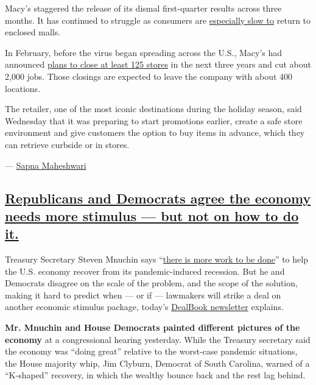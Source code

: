 Macy's staggered the release of its dismal first-quarter results across
three months. It has continued to struggle as consumers are
\href{https://www.nytimes3xbfgragh.onion/interactive/2020/08/18/business/economy/coronavirus-economic-recovery-states.html}{especially
slow to} return to enclosed malls.

In February, before the virus began spreading across the U.S., Macy's
had announced
\href{https://www.nytimes3xbfgragh.onion/2020/02/04/business/macys-store-closings.html}{plans
to close at least 125 stores} in the next three years and cut about
2,000 jobs. Those closings are expected to leave the company with about
400 locations.

The retailer, one of the most iconic destinations during the holiday
season, said Wednesday that it was preparing to start promotions
earlier, create a safe store environment and give customers the option
to buy items in advance, which they can retrieve curbside or in stores.

--- \href{https://www.nytimes3xbfgragh.onion/by/sapna-maheshwari}{Sapna
Maheshwari}

\hypertarget{republicans-and-democrats-agree-the-economy-needs-more-stimulus--but-not-on-how-to-do-it}{%
\subsection{\texorpdfstring{\protect\hyperlink{mnuchin}{Republicans and
Democrats agree the economy needs more stimulus --- but not on how to do
it.}}{Republicans and Democrats agree the economy needs more stimulus --- but not on how to do it.}}\label{republicans-and-democrats-agree-the-economy-needs-more-stimulus--but-not-on-how-to-do-it}}

Treasury Secretary Steven Mnuchin says
``\href{https://www.nytimes3xbfgragh.onion/2020/09/01/business/economy/mnuchin-coronavirus.html}{there
is more work to be done}'' to help the U.S. economy recover from its
pandemic-induced recession. But he and Democrats disagree on the scale
of the problem, and the scope of the solution, making it hard to predict
when --- or if --- lawmakers will strike a deal on another economic
stimulus package, today's
\href{https://www.nytimes3xbfgragh.onion/2020/09/02/business/dealbook/coronavirus-stimulus-bill.html}{DealBook
newsletter} explains.

\textbf{Mr. Mnuchin and House Democrats painted different pictures of
the economy} at a congressional hearing yesterday. While the Treasury
secretary said the economy was ``doing great'' relative to the
worst-case pandemic situations, the House majority whip, Jim Clyburn,
Democrat of South Carolina, warned of a ``K-shaped'' recovery, in which
the wealthy bounce back and the rest lag behind.

